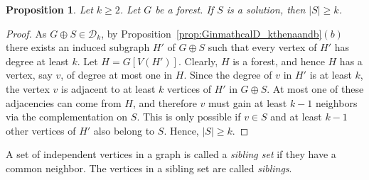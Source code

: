\documentclass[11pt]{article}
\newtheorem{proposition}[theorem]{Proposition}
\theoremstyle{definition}
\begin{document}
\begin{proposition} \label{prop:Sgeqk}
Let $k \geq 2$.
Let $G$ be a forest. If $S$ is a solution, then $|S| \geq k$.
\end{proposition}

\begin{proof}
As $G \oplus S \in \mathcal{D}_k$, by Proposition~\ref{prop:GinmathcalD_kthenaandb}$(b)$
there exists an induced subgraph $H'$ of $G \oplus S$ such that every vertex of $H'$
has degree at least $k$.
Let $H = G[V(H')]$. Clearly, $H$ is a forest, and hence $H$ has a vertex,
say $v$, of degree at most one in $H$.
Since the degree of $v$ in $H'$ is at least $k$, the vertex $v$ is adjacent
to at least $k$ vertices of $H'$ in $G \oplus S$.
At most one of these adjacencies can come from $H$, and therefore
$v$ must gain at least $k-1$ neighbors via the complementation on $S$.
This is only possible if $v \in S$ and at least $k-1$ other vertices of $H'$
also belong to $S$.
Hence, $|S| \geq k$.
\end{proof}

A set of independent vertices in a graph is called a \emph{sibling set} if they have a common neighbor. 
The vertices in a sibling set are called \emph{siblings}.
\end{document}
